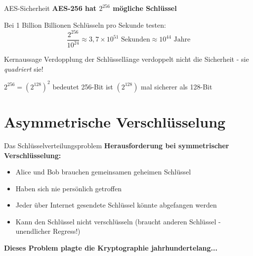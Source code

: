 \documentclass[handout]{beamer}
\begin{document}
\begin{frame}{AES-Sicherheit}
\textbf{AES-256 hat $2^{256}$ mögliche Schlüssel}

\vspace{0.3cm}
Bei 1 Billion Billionen Schlüsseln pro Sekunde testen:
\[
\frac{2^{256}}{10^{24}} \approx 3,7 \times 10^{51} \text{ Sekunden} \approx 10^{44} \text{ Jahre}
\]

\vspace{0.3cm}
\begin{alertblock}{Kernaussage}
Verdopplung der Schlüssellänge verdoppelt nicht die Sicherheit - sie \emph{quadriert} sie!

$2^{256} = (2^{128})^2$ bedeutet 256-Bit ist $(2^{128})$ mal sicherer als 128-Bit
\end{alertblock}
\end{frame}

\section{Asymmetrische Verschlüsselung}

\begin{frame}{Das Schlüsselverteilungsproblem}
\textbf{Herausforderung bei symmetrischer Verschlüsselung:}

\begin{itemize}
    \item Alice und Bob brauchen gemeinsamen geheimen Schlüssel
    \item Haben sich nie persönlich getroffen
    \item Jeder über Internet gesendete Schlüssel könnte abgefangen werden
    \item Kann den Schlüssel nicht verschlüsseln (braucht anderen Schlüssel - unendlicher Regress!)
\end{itemize}

\vspace{0.5cm}
\textbf{Dieses Problem plagte die Kryptographie jahrhundertelang...}

\end{frame}
\end{document}
